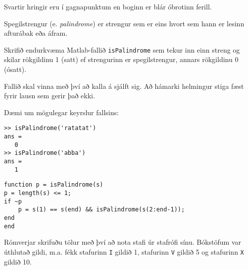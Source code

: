 \documentclass[addpoints]{exam}
\begin{document}
\begin{questions}
\begin{parts}
Svartir hringir eru í gagnapunktum en boginn er blár óbrotinn ferill.


\newpage
{}
\end{parts}
     
\question[10] Spegilstrengur (e. \emph{palindrome}) er strengur sem er eins hvort sem hann er lesinn afturábak eða áfram.

Skrifið endurkvæma Matlab-fallið \texttt{isPalindrome} sem tekur inn einn streng og skilar rökgildinu 1 (satt) ef strengurinn er spegilstrengur, annars rökgildinu 0 (ósatt). 

Fallið skal vinna með því að kalla á sjálft sig. Að hámarki helmingur stiga fæst fyrir lausn sem gerir það ekki.

Dæmi um mögulegar keyrslur fallsins:

\begin{verbatim}
>> isPalindrome('ratatat')
ans =
   0
>> isPalindrome('abba')
ans =
   1
\end{verbatim}

\begin{solution}
 
\begin{verbatim}
function p = isPalindrome(s)
p = length(s) <= 1;
if ~p
    p = s(1) == s(end) && isPalindrome(s(2:end-1));
end
end
\end{verbatim}

\end{solution}

\newpage

\question[10] Rómverjar skrifuðu tölur með því að nota stafi úr stafrófi sínu. Bókstöfum var úthlutað gildi, m.a. fékk stafurinn \texttt{I} gildið 1, stafurinn \texttt{V} gildið 5 og stafurinn \texttt{X} gildið 10.


\end{questions}
\end{document}
